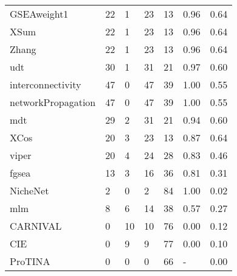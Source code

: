 \begin{table}[]
\begin{tabular}{lllllll}
GSEAweight1        & 22                 & 1               & 23             & 13                 & 0.96                  & 0.64              \\
XSum               & 22                 & 1               & 23             & 13                 & 0.96                  & 0.64              \\
Zhang              & 22                 & 1               & 23             & 13                 & 0.96                  & 0.64              \\
udt                & 30                 & 1               & 31             & 21                 & 0.97                  & 0.60              \\
interconnectivity  & 47                 & 0               & 47             & 39                 & 1.00                  & 0.55              \\
networkPropagation & 47                 & 0               & 47             & 39                 & 1.00                  & 0.55              \\
mdt                & 29                 & 2               & 31             & 21                 & 0.94                  & 0.60              \\
XCos               & 20                 & 3               & 23             & 13                 & 0.87                  & 0.64              \\
viper              & 20                 & 4               & 24             & 28                 & 0.83                  & 0.46              \\
fgsea              & 13                 & 3               & 16             & 36                 & 0.81                  & 0.31              \\
NicheNet           & 2                  & 0               & 2              & 84                 & 1.00                  & 0.02              \\
mlm                & 8                  & 6               & 14             & 38                 & 0.57                  & 0.27              \\
CARNIVAL           & 0                  & 10              & 10             & 76                 & 0.00                  & 0.12              \\
CIE                & 0                  & 9               & 9              & 77                 & 0.00                  & 0.10              \\
ProTINA            & 0                  & 0               & 0              & 66                 & -                     & 0.00              \\ \hline
\end{tabular}
\end{table}



